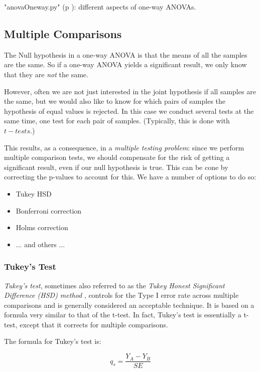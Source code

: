 \PyImg "anovaOneway.py" (p \pageref{py:anovaOneway}): different aspects of one-way ANOVAs.

\subsection{Multiple Comparisons}

The Null hypothesis in a one-way ANOVA is that the means of all the samples are the same. So if a one-way ANOVA yields a significant result, we only know that they are \emph{not} the same.

However, often we are not just interested in the joint hypothesis if all samples are the same, but we would also like to know for which pairs of samples the hypothesis of equal values is rejected. In this case we conduct several tests at the same time, one test for each pair of samples. (Typically, this is done with $t-tests$.)

This results, as a consequence, in a \emph{multiple testing problem}:
since we perform multiple comparison tests, we should compensate for the risk of getting a significant result, even if our null hypothesis is true. This can be cone by correcting the p-values to account for this. We have a number of options to do so:

\begin{itemize}
  \item Tukey HSD
  \item Bonferroni correction
  \item Holms correction
  \item ... and others ...
\end{itemize}


\subsubsection{Tukey's Test}

\emph{Tukey's test}, sometimes also referred to as the \emph{Tukey Honest Significant Difference (HSD) method }, controls for the Type I error rate across multiple comparisons and is generally considered an acceptable technique. It is based on a formula very similar to that of the t-test. In fact, Tukey's test is essentially a t-test, except that it corrects for multiple comparisons.

The formula for Tukey's test is:

\begin{equation}
    q_s = \frac{Y_A - Y_B}{SE}
\end{equation}

